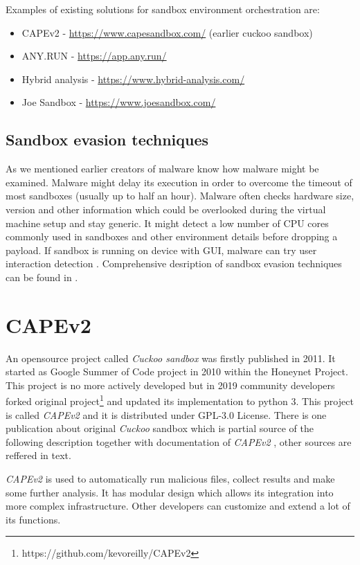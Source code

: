 Examples of existing solutions for sandbox environment orchestration are:
\begin{itemize}
  \item CAPEv2 - \url{https://www.capesandbox.com/} (earlier cuckoo sandbox)
  \item ANY.RUN - \url{https://app.any.run/}
  \item Hybrid analysis - \url{https://www.hybrid-analysis.com/}
  \item Joe Sandbox - \url{https://www.joesandbox.com/}
\end{itemize}

\subsection{Sandbox evasion techniques}
As we mentioned earlier creators of malware know how malware might be examined. Malware might delay its execution in order to overcome the timeout of most sandboxes (usually up to half an hour). Malware often checks hardware size, version and other information which could be overlooked during the virtual machine setup and stay generic. It might detect a low number of CPU cores commonly used in sandboxes and other environment details before dropping a payload. If sandbox is running on device with GUI, malware can try user interaction detection \cite{Evolutio45:online}. Comprehensive desription of sandbox evasion techniques can be found in \cite{Afianian2018}.

\section{CAPEv2}
An opensource project called \emph{Cuckoo sandbox} was firstly published in 2011. It started as Google Summer of Code project in 2010 within the Honeynet Project. This project is no more actively developed but in 2019 community developers forked original project\footnote{https://github.com/kevoreilly/CAPEv2} and updated its implementation to python 3. This project is called \emph{CAPEv2} and it is distributed under GPL-3.0 License. There is one publication about original \emph{Cuckoo} sandbox \cite{Oktavianto2013} which is partial source of the following description together with documentation of \emph{CAPEv2} \cite{CAPESand75:online}, other sources are reffered in text.

\emph{CAPEv2} is used to automatically run malicious files, collect results and make some further analysis. It has modular design which allows its integration into more complex infrastructure. Other developers can customize and extend a lot of its functions.

